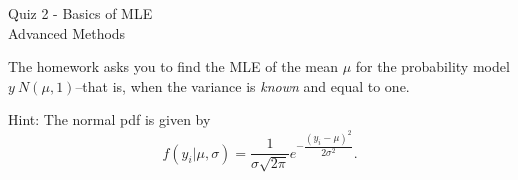 \documentclass[12pt]{exam2}
\begin{document}
\begin{center}
{\LARGE Quiz 2 - Basics of MLE}\\\vspace{2mm}
\vspace{3mm}
{\large Advanced Methods}\\\vspace{2mm}
\end{center}

\begin{questions}
\question The homework asks you to find the MLE of the mean $\mu$ for the probability model $y ~ N(\mu, 1)$--that is, when the variance is \textit{known} and equal to one. 
Hint: The normal pdf is given by
\begin{equation*}
f(y_i | \mu, \sigma) = \dfrac{1}{\sigma \sqrt{2\pi}}e^{-\dfrac{(y_i - \mu)^2}{2\sigma^2}}.
\end{equation*}

\end{questions}
\end{document}

